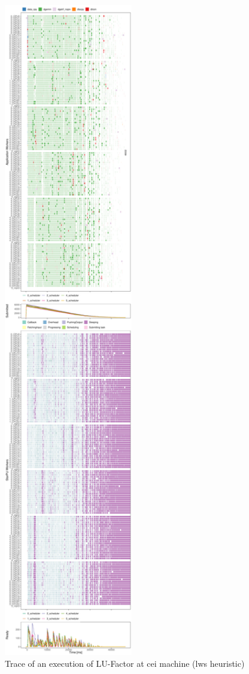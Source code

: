 \documentclass[conference, 10pt, final]{IEEEtran}
\begin{document}
\begin{figure}[ht]
\centering
\includegraphics[width=0.5\textwidth]{719424.pdf}
\caption{Trace of an execution of LU-Factor at cei machine (lws heuristic)}
\label{fig:trace}
\end{figure}
\end{document}
